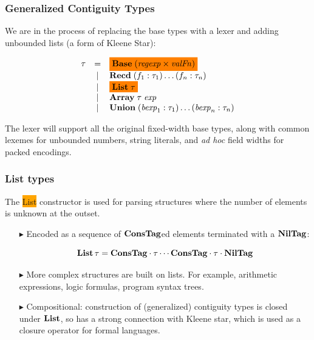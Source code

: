 \documentclass{beamer}
\newcommand{\adhoc}{\textit{ad hoc}}
\newcommand{\kemph}[1]{\colorbox{orange}{#1}}
\newcommand{\highlight}[2][orange]{\mathchoice%
  {\colorbox{#1}{$\displaystyle#2$}}%
  {\colorbox{#1}{$\textstyle#2$}}%
  {\colorbox{#1}{$\scriptstyle#2$}}%
  {\colorbox{#1}{$\scriptscriptstyle#2$}}}%
\newcommand{\konst}[1]{\ensuremath{\mbox{\bf{#1}}}}
\begin{document}
\begin{frame}\frametitle{Generalized Contiguity Types}

We are in the process of replacing the base types with a lexer and
adding unbounded lists (a form of Kleene Star):

\[
\begin{array}{rcl}
 \tau & =    & \highlight{\konst{Base}\; (\mathit{regexp} \times \mathit{valFn})} \\
      & \mid & \konst{Recd}\; (f_1 : \tau_1) \ldots (f_n : \tau_n) \\
      & \mid & \highlight{\konst{List}\; \tau} \\
      & \mid & \konst{Array}\; \tau \; \mathit{exp} \\
      & \mid & \konst{Union}\; (\mathit{bexp}_1 : \tau_1) \ldots (\mathit{bexp}_n : \tau_n)
\end{array}
\]

The lexer will support all the original fixed-width base types, along
with common lexemes for unbounded numbers, string literals, and
\adhoc{} field widths for packed encodings.

\end{frame}


\begin{frame}[fragile]\frametitle{List types}

The \kemph{List} constructor is used for parsing structures where the
number of elements is unknown at the outset.

\begin{itemize}

\item [$\blacktriangleright$] Encoded as a sequence of \konst{ConsTag}ed elements
  terminated with a \konst{NilTag}:

\[
  \konst{List}\, \tau = \konst{ConsTag} \cdot \tau \cdots \konst{ConsTag} \cdot \tau \cdot \konst{NilTag}
\]

\item [$\blacktriangleright$] More complex structures are built on
  lists. For example, arithmetic expressions, logic formulas, program
  syntax trees.

\item [$\blacktriangleright$] Compositional: construction of
  (generalized) contiguity types is closed under $\konst{List}$, so
  has a strong connection with Kleene star, which is used as a closure
  operator for formal languages.

\end{itemize}
\end{frame}
\end{document}
